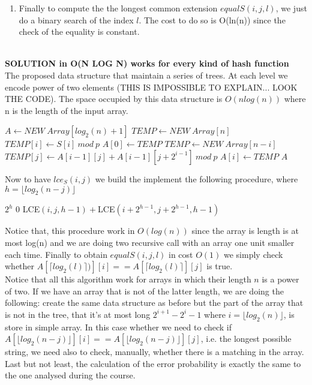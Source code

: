 \documentclass[a4paper]{article}
\begin{document}
\begin{enumerate}
\item Finally to compute the the longest common extension $equalS(i, j,\textit{l})$, we just do a binary search of the index $l$. The cost to do so is O(ln(n)) since the check of the equality is constant.
\end{enumerate}

\newpage \qquad \\
\textbf{SOLUTION in O(N LOG N) works for every kind of hash function}
\\
The proposed data structure that maintain a series of trees. At each level we encode power of two elements (THIS IS IMPOSSIBLE TO EXPLAIN... LOOK THE CODE). The space occupied by this data structure is $O(nlog(n))$ where n is the length of the input array.   
\begin{algorithmic}
\State $A \gets NEW \ Array[log_2(n)+1]$
\State $TEMP \gets NEW \ Array[n]$
\State $TEMP[i] \gets S[i] \ mod \ p$
\EndFor 
\State $A[0] \gets TEMP$
\State $TEMP \gets NEW \ Array[n-i]$ 
\State $TEMP[j] \gets A[i-1][j] + A[i-1][j+2^{i-1}] \ mod \ p$
\EndFor 
\State $A[i] \gets TEMP$
\EndFor 
\State \Return $A$
\EndFunction
\end{algorithmic}
Now to have $lce_S(i, j)$ we build the implement the following procedure, where $h=\lfloor log_2(n-j)\rfloor$
\begin{algorithmic}
    \State \Return $2^h$
\Else
        \State \Return $0$
    \Else
    	\State \Return LCE$(i, j,h-1) +$LCE$(i+2^{h-1},j+2^{h-1},h-1)$ 
    \EndIf
\EndIf
\EndFunction
\end{algorithmic}
Notice that, this procedure work in $O(log(n))$ since the array is length is at most log(n) and we are doing two recursive call with an array one unit smaller each time. Finally to obtain $equalS(i, j,\textit{l})$ in cost $O(1)$ we simply check whether $A[\lceil log_2(l) \rceil )][i]== A[\lceil log_2(l) \rceil ][j]$ is true. \\
Notice that all this algorithm work for arrays in which their length $n$ is a power of two. If we have an array that is not of the latter length, we are doing the following: create the same data structure as before but the part of the array that is not in the tree, that it's at most long $2^{i+1}-2^{i}-1$ where $i= \lfloor log_2(n)\rfloor$, is store in simple array. In this case whether we need to check if $A[\lfloor log_2(n-j)\rfloor][i]== A[\lfloor log_2(n-j)\rfloor][j]$, i.e. the longest possible string, we need also to check, manually, whether there is a matching in the array. Last but not least, the calculation of the error probability is exactly the same to the one analysed during the course.  
\end{document}

